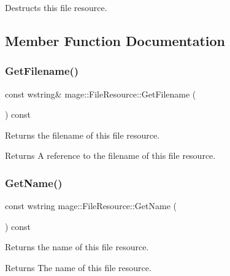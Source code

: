 Destructs this file resource. 

\subsection{Member Function Documentation}
\hypertarget{classmage_1_1_file_resource_a25607552b782ae252851311d9b07fcd7}{}\label{classmage_1_1_file_resource_a25607552b782ae252851311d9b07fcd7} 
\subsubsection{\texorpdfstring{Get\+Filename()}{GetFilename()}}
{\footnotesize\ttfamily const wstring\& mage\+::\+File\+Resource\+::\+Get\+Filename (\begin{DoxyParamCaption}{ }\end{DoxyParamCaption}) const\hspace{0.3cm}{\ttfamily [noexcept]}}

Returns the filename of this file resource.

\begin{DoxyReturn}{Returns}
A reference to the filename of this file resource. 
\end{DoxyReturn}
\hypertarget{classmage_1_1_file_resource_af53d0744d4c952286b7c00d63b9f0fb8}{}\label{classmage_1_1_file_resource_af53d0744d4c952286b7c00d63b9f0fb8} 
\subsubsection{\texorpdfstring{Get\+Name()}{GetName()}}
{\footnotesize\ttfamily const wstring mage\+::\+File\+Resource\+::\+Get\+Name (\begin{DoxyParamCaption}{ }\end{DoxyParamCaption}) const\hspace{0.3cm}{\ttfamily [noexcept]}}

Returns the name of this file resource.

\begin{DoxyReturn}{Returns}
The name of this file resource. 
\end{DoxyReturn}
\hypertarget{classmage_1_1_file_resource_a5c7d183fb6e55d6c91b6b336c68ffc82}{}\label{classmage_1_1_file_resource_a5c7d183fb6e55d6c91b6b336c68ffc82} 
